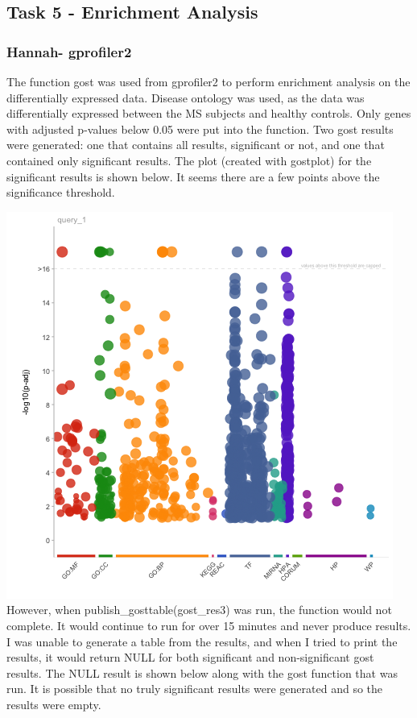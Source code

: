 \documentclass[
]{article}
\begin{document}
\subsection{Task 5 - Enrichment
Analysis}\label{task-5---enrichment-analysis}

\subsubsection{Hannah- gprofiler2}\label{hannah--gprofiler2}

The function gost was used from gprofiler2 to perform enrichment
analysis on the differentially expressed data. Disease ontology was
used, as the data was differentially expressed between the MS subjects
and healthy controls. Only genes with adjusted p-values below 0.05 were
put into the function. Two gost results were generated: one that
contains all results, significant or not, and one that contained only
significant results. The plot (created with gostplot) for the
significant results is shown below. It seems there are a few points
above the significance threshold.

\includegraphics{../../plots/SRP164913_gprofiler_gostplot.png} However,
when publish\_gosttable(gost\_res3) was run, the function would not
complete. It would continue to run for over 15 minutes and never produce
results. I was unable to generate a table from the results, and when I
tried to print the results, it would return NULL for both significant
and non-significant gost results. The NULL result is shown below along
with the gost function that was run. It is possible that no truly
significant results were generated and so the results were empty.
\end{document}
